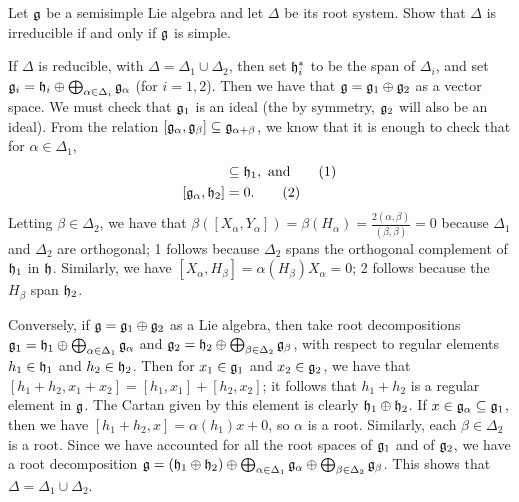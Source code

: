  \begin{exercise}
   Let $\mathfrak{g}$ be a semisimple Lie algebra and let $\Delta$ be its root system. Show that
   $\Delta$ is irreducible if and only if $\mathfrak{g}$ is simple.
   \begin{solution}
     If $\Delta$ is reducible, with $\Delta=\Delta_1\cup \Delta_2$, then set $\mathfrak{h}_i^*$ to
     be the span of $\Delta_i$, and set $\mathfrak{g}_i=\mathfrak{h}_i\oplus \bigoplus_{\alpha\in
     \Delta_i}\mathfrak{g}_\alpha$ (for $i=1,2$). Then we have that $\mathfrak{g}=\mathfrak{g}_1\oplus \mathfrak{g}_2$ as a
     vector space. We must check that $\mathfrak{g}_1$ is an ideal (the by symmetry, $\mathfrak{g}_2$ will
     also be an ideal). From the relation $[\mathfrak{g}_\alpha,\mathfrak{g}_\beta]\subseteq
     \mathfrak{g}_{\alpha+\beta}$, we know that it is enough to check that for $\alpha\in
     \Delta_1$,
     \begin{align*}
     [\g_\alpha,\g_{-\alpha}]&\subseteq \h_1, \text{ and} \tag{1}\\
     [\g_\alpha,\h_2]&=0.\tag{2}
     \end{align*}
     Letting $\beta\in \Delta_2$, we have that
     $\beta([X_\alpha,Y_\alpha])=\beta(H_\alpha) =
     \frac{2(\alpha,\beta)}{(\beta,\beta)}=0$ because $\Delta_1$ and $\Delta_2$ are
     orthogonal; 1 follows because $\Delta_2$ spans the orthogonal complement of
     $\mathfrak{h}_1$ in $\mathfrak{h}$. Similarly, we have
     $[X_\alpha,H_\beta]=\alpha(H_\beta)X_\alpha=0$; 2 follows because the
     $H_\beta$ span $\mathfrak{h}_2$.

     Conversely, if $\mathfrak{g}=\mathfrak{g}_1\oplus \mathfrak{g}_2$ as a Lie algebra, then take root
     decompositions $\mathfrak{g}_1=\mathfrak{h}_1\oplus \bigoplus_{\alpha\in \Delta_1}\mathfrak{g}_\alpha$ and
     $\mathfrak{g}_2=\mathfrak{h}_2\oplus \bigoplus_{\beta\in \Delta_2} \mathfrak{g}_\beta$, with respect to regular
     elements $h_1\in \mathfrak{h}_1$ and $h_2\in \mathfrak{h}_2$. Then for $x_1\in\mathfrak{g}_1$ and $x_2\in
     \mathfrak{g}_2$, we have that $[h_1+h_2,x_1+x_2]=[h_1,x_1]+[h_2,x_2]$; it follows that
     $h_1+h_2$ is a regular element in $\mathfrak{g}$. The Cartan given by this element is
     clearly $\mathfrak{h}_1\oplus \mathfrak{h}_2$. If $x\in \mathfrak{g}_\alpha\subseteq \mathfrak{g}_1$, then we have
     $[h_1+h_2,x]=\alpha(h_1)x+0$, so $\alpha$ is a root. Similarly, each $\beta\in
     \Delta_2$ is a root. Since we have accounted for all the root spaces of $\mathfrak{g}_1$
     and of $\mathfrak{g}_2$, we have a root decomposition $\mathfrak{g}=(\mathfrak{h}_1\oplus \mathfrak{h}_2)\oplus
     \bigoplus_{\alpha\in \Delta_1}\mathfrak{g}_\alpha \oplus \bigoplus_{\beta\in
     \Delta_2}\mathfrak{g}_\beta$. This shows that $\Delta=\Delta_1\cup \Delta_2$.
   \end{solution}
 \end{exercise}

